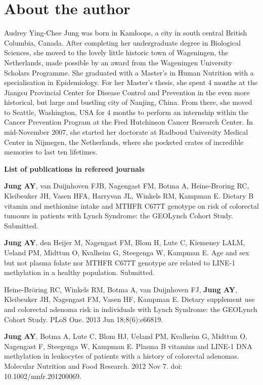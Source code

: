 \chapter*{About the author}
\label{About the author}

\newpage

\noindent Audrey Ying-Chee Jung was born in Kamloops, a city in south central British Columbia, Canada. After completing her undergraduate degree in Biological Sciences, she moved to the lovely little historic town of Wageningen, the Netherlands, made possible by an award from the Wageningen University Scholars Programme. She graduated with a Master's in Human Nutrition with a specialisation in Epidemiology. For her Master's thesis, she spent 4 months at the Jiangsu Provincial Center for Disease Control and Prevention in the even more historical, but large and bustling city of Nanjing, China. From there, she moved to Seattle, Washington, USA for 4 months to perform an internship within the Cancer Prevention Program at the Fred Hutchinson Cancer Research Center. In mid-November 2007, she started her doctorate at Radboud University Medical Center in Nijmegen, the Netherlands, where she pocketed crates of incredible memories to last ten lifetimes.

\newpage

\noindent \textbf{List of publications in refereed journals}

\noindent \textbf{Jung AY}, van Duijnhoven FJB, Nagengast FM, Botma A, Heine-Broring RC, Kleibeuker JH, Vasen HFA, Harryvan JL, Winkels RM, Kampman E. Dietary B vitamin and methionine intake and MTHFR C677T genotype on risk of colorectal tumours in patients with Lynch Syndrome: the GEOLynch Cohort Study. Submitted.

\noindent \textbf{Jung AY}, den Heijer M, Nagengast FM, Blom H, Lute C, Kiemeney LALM, Ueland PM, Midttun O, Kvalheim G, Steegenga W, Kampman E. Age and sex but not plasma folate nor MTHFR C677T genotype are related to LINE-1 methylation in a healthy population. Submitted.

\noindent Heine-Br\"oring RC, Winkels RM, Botma A, van Duijnhoven FJ, \textbf{Jung AY}, Kleibeuker JH, Nagengast FM, Vasen HF, Kampman E. Dietary supplement use and colorectal adenoma risk in individuals with Lynch Syndrome: the GEOLynch Cohort Study. PLoS One. 2013 Jun 18;8(6):e66819.

\noindent \textbf{Jung AY}, Botma A, Lute C, Blom HJ, Ueland PM, Kvalheim G, Midttun O, Nagengast F, Steegenga W, Kampman E. Plasma B vitamins and LINE-1 DNA methylation in leukocytes of patients with a history of colorectal adenomas. Molecular Nutrition and Food Research. 2012 Nov 7. doi: 10.1002/mnfr.201200069.

